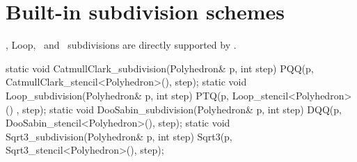 





\section{Built-in subdivision schemes}
\CC , Loop, \DS\ and \ subdivisions are directly supported 
by . 

\begin{ccExampleCode}
  static void CatmullClark_subdivision(Polyhedron& p, int step) {
    PQQ(p, CatmullClark_stencil<Polyhedron>(), step);
  }
  static void Loop_subdivision(Polyhedron& p, int step) {
    PTQ(p, Loop_stencil<Polyhedron>() , step);
  }
  static void DooSabin_subdivision(Polyhedron& p, int step) {
    DQQ(p, DooSabin_stencil<Polyhedron>(), step);
  }
  static void Sqrt3_subdivision(Polyhedron& p, int step) {
    Sqrt3(p, Sqrt3_stencil<Polyhedron>(), step);
  }
\end{ccExampleCode}


